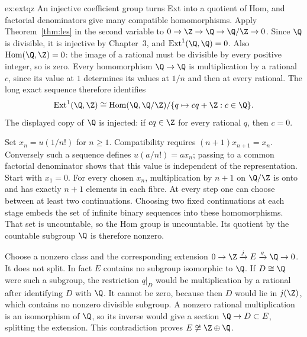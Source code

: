 \begin{solution}{ex:extqz}
\idea An injective coefficient group turns Ext into a quotient of Hom, and factorial denominators give many compatible homomorphisms.
\writeup Apply Theorem~\ref{thm:les} in the second variable to
$0\to\Z\to\Q\to\Q/\Z\to0$. Since $\Q$ is divisible, it is injective by Chapter~3, and $\operatorname{Ext}^1(\Q,\Q)=0$. Also $\operatorname{Hom}(\Q,\Z)=0$: the image of a rational must be divisible by every positive integer, so is zero. Every homomorphism $\Q\to\Q$ is multiplication by a rational $c$, since its value at $1$ determines its values at $1/n$ and then at every rational. The long exact sequence therefore identifies
\[
\operatorname{Ext}^1(\Q,\Z)\cong
\operatorname{Hom}(\Q,\Q/\Z)/\{q\mapsto cq+\Z:c\in\Q\}.
\]
The displayed copy of $\Q$ is injected: if $cq\in\Z$ for every rational $q$, then $c=0$.

Set $x_n=u(1/n!)$ for $n\ge1$. Compatibility requires
$(n+1)x_{n+1}=x_n$. Conversely such a sequence defines
$u(a/n!)=ax_n$; passing to a common factorial denominator shows that this value is independent of the representation. Start with $x_1=0$. For every chosen $x_n$, multiplication by $n+1$ on $\Q/\Z$ is onto and has exactly $n+1$ elements in each fibre. At every step one can choose between at least two continuations. Choosing two fixed continuations at each stage embeds the set of infinite binary sequences into these homomorphisms. That set is uncountable, so the Hom group is uncountable. Its quotient by the countable subgroup $\Q$ is therefore nonzero.

Choose a nonzero class and the corresponding extension
$0\to\Z\xrightarrow{j}E\xrightarrow{q}\Q\to0$.
It does not split. In fact $E$ contains no subgroup isomorphic to $\Q$. If $D\cong\Q$ were such a subgroup, the restriction $q|_D$ would be multiplication by a rational after identifying $D$ with $\Q$. It cannot be zero, because then $D$ would lie in $j(\Z)$, which contains no nonzero divisible subgroup. A nonzero rational multiplication is an isomorphism of $\Q$, so its inverse would give a section $\Q\to D\subset E$, splitting the extension. This contradiction proves $E\not\cong\Z\oplus\Q$.
\end{solution}

